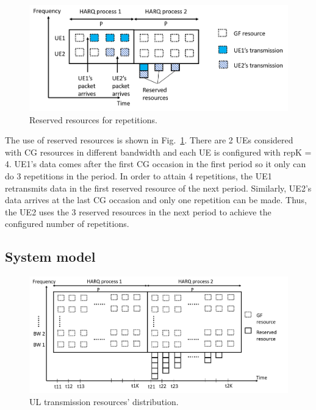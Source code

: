 \documentclass{report}
\begin{document}
\begin{figure}[htbp]
\centerline{\includegraphics[scale=0.30]{fig17.png}}
\caption{Reserved resources for repetitions.}
\label{fig17}
\end{figure}

The use of reserved resources is shown in Fig.~\ref{fig17}. There are 2 UEs considered with CG resources in different bandwidth and each UE is configured with repK = 4. UE1's data comes after the first CG occasion in the first period so it only can do 3 repetitions in the period. In order to attain 4 repetitions, the UE1 retransmits data in the first reserved resource of the next period. Similarly, UE2's data arrives at the last CG occasion and only one repetition can be made. Thus, the UE2 uses the 3 reserved resources in the next period to achieve the configured number of repetitions.

\subsection{System model}\label{322}

\begin{figure}[htbp]
\centerline{\includegraphics[scale=0.3]{fig18.png}}
\caption{UL transmission resources' distribution.}
\label{fig18}
\end{figure}
\end{document}

